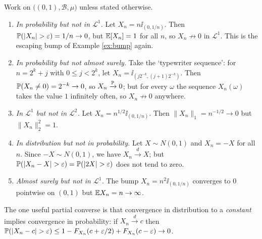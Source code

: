 \documentclass[a4paper]{scrartcl}
\newcommand{\cB}{\mathcal{B}}
\newcommand{\cL}{\mathcal{L}}
\newcommand{\ind}{\ii}
\begin{document}
\begin{center}
\end{center}

\begin{example}\label{ex:mode-counter}
	Work on $\big((0,1),\cB,\mu\big)$ unless stated otherwise.
	\begin{enumerate}[label=(\roman*)]
		\item \emph{In probability but not in $\cL^1$.} Let $X_n = n\ind_{(0,1/n)}$. Then $\PP(|X_n|>\varepsilon)=1/n\to0$, but $\mathbb{E}[X_n]=1$ for all $n$, so $X_n \not\to0$ in $\cL^1$. This is the escaping bump of Example \ref{ex:bump} again.
		\item \emph{In probability but not almost surely.} Take the `typewriter sequence': for $n = 2^k + j$ with $0 \leq j < 2^k$, let $X_n = \ind_{(j2^{-k},(j+1)2^{-k})}$. Then $\mathbb{P}(X_n \neq 0)=2^{-k}\to0$, so $X_n \xrightarrow{\mathbb{P}}0$; but for every $\omega$ the sequence $X_n(\omega)$ takes the value $1$ infinitely often, so $X_n \not\to 0$ anywhere.
		\item \emph{In $\cL^1$ but not in $\cL^2$.} Let $X_n = n^{1/2}\ind_{(0,1/n)}$. Then $\|X_n\|_1 = n^{-1/2}\to0$ but $\|X_n\|_2^2 = 1$.
		\item \emph{In distribution but not in probability.} Let $X \sim N(0,1)$ and $X_n = -X$ for all $n$. Since $-X\sim N(0,1)$, we have $X_n \xrightarrow{d}X$; but $\PP(|X_n - X|>\varepsilon)=\PP(|2X|>\varepsilon)$ does not tend to zero.
		\item \emph{Almost surely but not in $\cL^1$.} The bump $X_n = n^2\ind_{(0,1/n)}$ converges to $0$ pointwise on $(0,1)$ but $\mathbb{E} X_n = n \to\infty$.
	\end{enumerate}
\end{example}

The one useful partial converse is that convergence in distribution to a \emph{constant} implies convergence in probability: if $X_n \xrightarrow{d} c$ then $\PP(|X_n - c|>\varepsilon)\leq 1 - F_{X_n}(c+\varepsilon/2)+F_{X_n}(c-\varepsilon)\to 0$.
\end{document}

